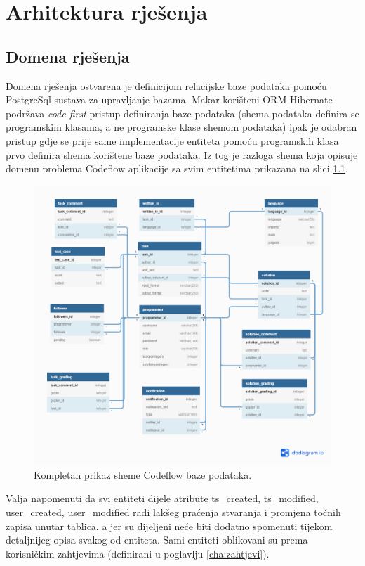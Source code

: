 \documentclass[times, utf8, zavrsni]{fer}
\begin{document}
	\chapter{Arhitektura rješenja}
		\section{Domena rješenja}
		\label{sec:domenarjesenja}
		Domena rješenja ostvarena je definicijom relacijske baze podataka pomoću PostgreSql sustava za upravljanje bazama. Makar korišteni ORM Hibernate podržava \textit{code-first} pristup definiranja baze podataka (shema podataka definira se programskim klasama, a ne programske klase shemom podataka) ipak je odabran pristup gdje se prije same implementacije entiteta pomoću programskih klasa prvo definira shema korištene baze podataka. Iz tog je razloga shema koja opisuje domenu problema Codeflow aplikacije sa svim entitetima prikazana na slici \ref{fig:db}.
		\begin{figure}[H]
			\centering
			\includegraphics[width=\linewidth]{pictures/prikazi/Database.png}
			\caption{Kompletan prikaz sheme Codeflow baze podataka.}
			\label{fig:db}
		\end{figure}
		Valja napomenuti da svi entiteti dijele atribute ts\_created, ts\_modified, user\_created, user\_modified radi lakšeg praćenja stvaranja i promjena točnih zapisa unutar tablica, a jer su dijeljeni neće biti dodatno spomenuti tijekom detaljnijeg opisa svakog od entiteta. Sami entiteti oblikovani su prema korisničkim zahtjevima (definirani u poglavlju \ref{cha:zahtjevi}).
\end{document}
